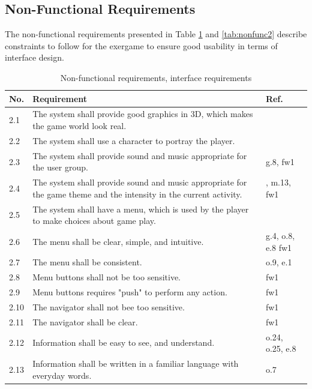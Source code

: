 \subsection{Non-Functional Requirements}
The non-functional requirements presented in Table \ref{tab:nfunc1} and \ref{tab:nonfunc2} describe constraints to follow for the exergame to ensure good usability in terms of interface design.

\begin{table} [H]
\centering
\begin{tabular}{|>{\raggedright}p{}|p{}|p{}|} 
\hline
\textbf{No.} & \textbf{Requirement} & \textbf{Ref.} \\ \hline
2.1 & The system shall provide good graphics in 3D, which makes the game world look real. & \cite{understandingvg} \cite{john2012smartsenior}\\ \hline
2.2 & The system shall use a character to portray the player. & \cite{understandingvg} \cite{john2012smartsenior}\\ \hline
2.3 & The system shall provide sound and music appropriate for the user group. & g.8, fw1 \\ \hline
2.4 & The system shall provide sound and music appropriate for the game theme and the intensity in the current activity. & \cite{umlapproach}, m.13, fw1 \\ \hline
2.5 & The system shall have a menu, which is used by the player to make choices about game play. & \cite{gerling2} \cite{john2012smartsenior}\\ \hline
2.6 & The menu shall be clear, simple, and intuitive. & \cite{sweetser} g.4, o.8, e.8 fw1 \\ \hline
2.7 & The menu shall be consistent. & o.9, e.1 \\ \hline
2.8 & Menu buttons shall not be too sensitive. & fw1 \\ \hline
2.9 & Menu buttons requires "push" to perform any action. &  fw1\\ \hline
2.10 & The navigator shall not bee too sensitive. & fw1\\ \hline
2.11 & The navigator shall be clear. &  fw1\\ \hline
2.12 & Information shall be easy to see, and understand. & o.24, o.25, e.8\\ \hline
2.13 & Information shall be written in a familiar language with everyday words. & o.7\\ \hline
\end{tabular}
\caption[Non-functional requirements, part 1]{Non-functional requirements, interface requirements}
\label{tab:nfunc1}
\end{table} 
